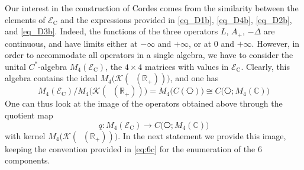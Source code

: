\documentclass[11pt]{article}
\def\C{\mathbb C}
\def\EEC{\mathscr E_{\mathrm C}}
\def\K{\mathscr K}
\def\R{\mathbb R}
\def\ltwo{\mathop{\mathrm{L}^2}\nolimits}
\begin{document}
Our interest in the construction of Cordes comes from the similarity between the elements of $\EEC$
and the expressions provided in \eqref{eq_D1b}, \eqref{eq_D4b}, \eqref{eq_D2b}, and \eqref{eq_D3b}. Indeed, the functions of the three operators $L$, $A_+$, $-\Delta$ are continuous, and have limits either at $-\infty$ and $+\infty$, or at $0$ and $+\infty$. 
However, in order to accommodate all operators in a single algebra, we have to consider
the unital $C^*$-algebra $M_4(\EEC)$, the $4\times 4$ matrices with values in $\EEC$. Clearly, this algebra contains the ideal
$M_4\big(\K(\ltwo(\R_+))\big)$, and one has
\begin{equation}\label{eq_quotient}
M_4(\EEC) \big/ M_4\big(\K(\ltwo(\R_+))\big)
= M_4\big(C(\hexagon)\big)\cong C\big(\hexagon; M_4(\C)\big)
\end{equation}
One can thus look at the image of the operators obtained above through the quotient map
$$
q: M_4(\EEC) \to C\big(\hexagon; M_4(\C)\big)
$$
with kernel $M_4\big(\K(\ltwo(\R_+))\big)$.
In the next statement we provide this image, keeping the convention provided in \eqref{eq:6c}
for the enumeration of the $6$ components.
\end{document}

